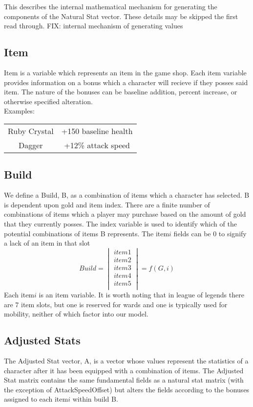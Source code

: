 \documentclass{article}
\begin{document}
This describes the  internal mathematical mechanism for generating the components of the Natural Stat vector.  These details may be skipped the first read through.
FIX: internal mechanism of generating values
\subsection{Item}
Item is a variable which represents an item in the game shop.  Each item variable provides information on a bonus which a character will recieve if they posses said item. The nature of the bonuses can be baseline addition, percent increase, or otherwise specified alteration.\\  Examples:\\
\begin{tabular}{|c|c|}
Ruby Crystal & +150  baseline health \\
Dagger &  +12\% attack speed
\end{tabular}
\subsection{Build}
We define a Build, B, as a combination of items which a character has selected.  B is dependent upon gold and item index.  There are a finite number of combinations of items which a player may purchase based on the amount of gold that they currently posses.  The index variable is used to identify which of the potential combinations of items B represents.  The item$i$ fields can be 0 to signify a lack of an item in that slot
\begin{equation}
	Build = 
\begin{vmatrix}
	item1\\
	item2\\
	item3\\
	item4\\
	item5\\
\end{vmatrix}=
f(G,i)
\end{equation}
Each item$i$ is an item variable. It is worth noting that in  league of legends there are 7 item slots, but one is reserved for wards and one is typically used for mobility, neither of which  factor into our model.

\subsection{Adjusted Stats}
The Adjusted Stat vector, A, is a vector whose values represent the statistics of a character after it has been equipped with a combination of items.  The Adjusted Stat matrix contains the same fundamental fields as a natural stat matrix (with the exception of AttackSpeedOffset)  but alters the fields according to the bonuses assigned to each item$i$ within build B.
\end{document}

